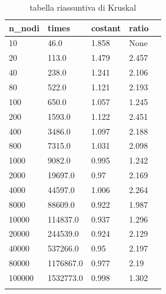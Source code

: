 \renewcommand{\arraystretch}{2}
\begin{longtable}[H]{|p{2cm}|p{2cm}|p{3cm}|p{3cm}|p{3cm}|} \hline
    \rowcolor{lightgray}
    \textbf{n\_nodi} & \textbf{times} & \textbf{costant} & \textbf{ratio} \\ \hline\hline
    \endhead
    10	&	    46.0	&		1.858 &		None \\ \hline
    20	&	    113.0	&		1.479 &		2.457 \\ \hline
    40	&	    238.0	&		1.241 &		2.106 \\ \hline
    80	&	    522.0	&		1.121 &		2.193 \\ \hline
    100	&	    650.0	&		1.057 &		1.245 \\ \hline
    200	&	    1593.0	&		1.122 &		2.451 \\ \hline
    400	&	    3486.0	&		1.097 &		2.188 \\ \hline
    800	&	    7315.0	&		1.031 &		2.098 \\ \hline
    1000 &	    9082.0	&		0.995 &		1.242 \\ \hline
    2000 &	    19697.0	&		0.97  &  	2.169 \\ \hline
    4000 &	    44597.0	&	    1.006 &		2.264 \\ \hline
    8000 &		88609.0	&	    0.922 &		1.987 \\ \hline
    10000 &		114837.0 &		0.937 &		1.296 \\ \hline
    20000 &		244539.0 &		0.924 &		2.129 \\ \hline
    40000 &		537266.0 &		0.95 &		2.197 \\ \hline
    80000 &		1176867.0 &		0.977 &	    2.19 \\ \hline
    100000 &	1532773.0 &		0.998 &	    1.302 \\ \hline
    \caption{tabella riassuntiva di Kruskal}
\end{longtable}


